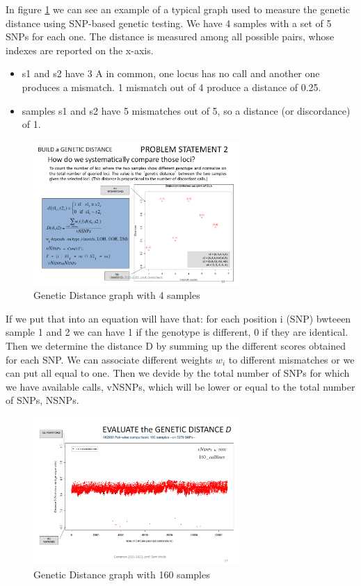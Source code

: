 In figure \ref{fig:Distance} we can see an example of a typical graph used to
measure the genetic distance using SNP-based genetic testing. We have 4 samples
with a set of 5 SNPs for each one. The distance is measured among all possible
pairs, whose indexes are reported on the x-axis. 
\begin{itemize}
	\item s1 and s2 have 3 A in common, one locus has no call and another one
	produces a mismatch. 1 mismatch out of 4 produce a distance of 0.25.
	\item samples s1 and s2 have 5 mismatches out of 5, so a distance (or
	discordance) of 1. 
\end{itemize}

\begin{figure}
	\centering
	\includegraphics[width=0.7\textwidth]{Distance.PNG}
	\caption{\label{fig:Distance}Genetic Distance graph with 4 samples}
\end{figure}

If we put that into an equation will have that: for each position i (SNP)
bwteeen sample 1 and 2 we can have 1 if the genotype is different, 0 if they are
identical. Then we determine the distance D by summing up the different scores
obtained for each SNP. We can associate different weights $w_i$ to different
mismatches or we can put all equal to one. Then we devide by the total number of
SNPs for which we have available calls, vNSNPs, which will be lower or equal to
the total number of SNPs, NSNPs. 

%
\begin{figure}
	\centering
	\includegraphics[width=0.7\textwidth]{Distance2.PNG}
	\caption{\label{fig:Distance2}Genetic Distance graph with 160 samples}
\end{figure}

